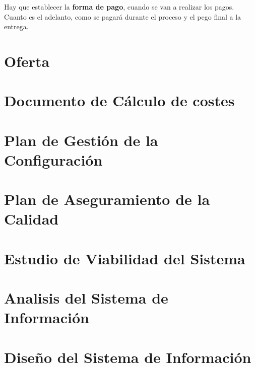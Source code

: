 \documentclass[12pt, twoside, openright]{report} %
\begin{document}
Hay que establecer la \textbf{forma de pago}, cuando se van a realizar
los pagos. Cuanto es el adelanto, como se pagará durante el proceso y el
pego final a la entrega.

\part{Oferta}



\part{Documento de Cálculo de costes}


\part{Plan de Gestión de la Configuración}



\part{Plan de Aseguramiento de la Calidad}



\part{Estudio de Viabilidad del Sistema}



\part{Analisis del Sistema de Información}



\part{Diseño del Sistema de Información}


\end{document}
